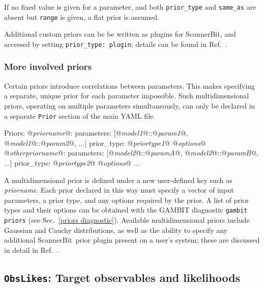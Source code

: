 \documentclass[pdftex,twocolumn,epjc3_preprint,runningheads]{svjour3}
\renewcommand{\_}{\discretionary{\underscore}{}{\underscore}}
\newcommand\cpp[1]{{\lstinline!#1!}}  %
\newcommand\yaml[1]{{\lstset{style=yaml}\lstinline!#1!\lstset{style=cpp}}}
\newcommand\yamlvalue[1]{{\YAMLvaluestyle\ttfamily#1}}
\newcommand\term[1]{{\lstset{style=terminal}\lstinline!#1!\lstset{style=cpp}}}
\newcommand\YAMLvaluestyle{\footnotesize\color{blue}\mdseries}
\newcommand{\metavarf}[1]{\textit{\color{darkgreen}\footnotesize\textrm{#1}}}
\newcommand{\metavar}{\metavarf}
\newcommand{\gambit}{\textsf{GAMBIT}\xspace}
\newcommand{\scannerbit}{\textsf{ScannerBit}\xspace}
\newcommand{\GB}{\gambit}
\newcommand\YAML{\textsf{YAML}\xspace}
\begin{document}
If no fixed value is given for a parameter, and both \yaml{prior_type} and \yaml{same_as} are absent but \yaml{range} is given, a \yamlvalue{flat} prior is assumed.

Additional custom priors can be be written as plugins for \scannerbit, and accessed by setting \yaml{prior_type: plugin}; details can be found in Ref.\ \cite{ScannerBit}.

\subsubsection{More involved priors}
\label{priors}
Certain priors introduce correlations between parameters.  This makes specifying a separate, unique prior for each parameter impossible.  Such multidimensional priors, operating on multiple parameters simultaneously, can only be declared in a separate \yaml{Prior} section of the main \YAML file.
%
\begin{lstyaml}
Priors:
  @\metavar{prior\_name}@:
    parameters: [@\metavar{model\_1}@::@\metavar{param1}@, @\metavar{model\_1}@::@\metavar{param2}@,
                   ...]
    prior_type: @\metavar{prior\_type\_1}@
    @\metavar{options}@
  @\metavar{other\_prior\_name}@:
    parameters: [@\metavar{model\_2}@::@\metavar{paramA}@, @\metavar{model\_2}@::@\metavar{paramB}@,
                   ...]
    prior_type: @\metavar{prior\_type\_2}@
    @\metavar{options}@
  ...
\end{lstyaml}
%
A multidimensional prior is defined under a new user-defined key such as \metavar{prior\_name}.  Each prior declared in this way must specify a vector of input parameters, a prior type, and any options required by the prior.  A list of prior types and their options can be obtained with the \GB diagnostic \term{gambit priors} (see Sec.\ \ref{priors diagnostic}).  Available multidimensional priors include Gaussian and Cauchy distributions, as well as the ability to specify any additional \scannerbit\ prior plugin present on a user's system; these are discussed in detail in Ref.\ \cite{ScannerBit}.

\subsection{\cpp{ObsLikes}: Target observables and likelihoods}
\label{ObsLikes}
\end{document}
